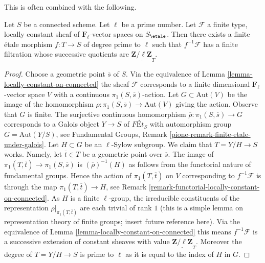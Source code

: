 \medskip\noindent
This is often combined with the following.

\begin{lemma}
\label{lemma-pullback-filtered}
Let $S$ be a connected scheme. Let $\ell$ be a prime number. Let
$\mathcal{F}$ a finite type, locally constant sheaf of
$\mathbf{F}_\ell$-vector spaces on $S_\etale$.
Then there exists a finite \'etale morphism
$f : T \to S$ of degree prime to $\ell$ such that $f^{-1}\mathcal{F}$
has a finite filtration whose successive quotients are
$\underline{\mathbf{Z}/\ell\mathbf{Z}}_T$.
\end{lemma}

\begin{proof}
Choose a geometric point $\overline{s}$ of $S$.
Via the equivalence of Lemma \ref{lemma-locally-constant-on-connected}
the sheaf $\mathcal{F}$ corresponds to a finite dimensional
$\mathbf{F}_\ell$-vector space $V$ with a continuous
$\pi_1(S, \overline{s})$-action.
Let $G \subset \text{Aut}(V)$ be the image of the homomorphism
$\rho : \pi_1(S, \overline{s}) \to \text{Aut}(V)$ giving the action.
Observe that $G$ is finite.
The surjective continuous homomorphism
$\overline{\rho} : \pi_1(S, \overline{s}) \to G$
corresponds to a Galois object $Y \to S$ of
$\textit{F\'Et}_S$ with automorphism group $G = \text{Aut}(Y/S)$, see
Fundamental Groups, Remark \ref{pione-remark-finite-etale-under-galois}.
Let $H \subset G$ be an $\ell$-Sylow subgroup.
We claim that $T = Y/H \to S$ works. Namely, let $\overline{t} \in T$
be a geometric point over $\overline{s}$. The image of
$\pi_1(T, \overline{t}) \to \pi_1(S, \overline{s})$
is $(\overline{\rho})^{-1}(H)$ as follows from the functorial
nature of fundamental groups. Hence the action of $\pi_1(T, \overline{t})$
on $V$ corresponding to $f^{-1}\mathcal{F}$ is through
the map $\pi_1(T, \overline{t}) \to H$, see
Remark \ref{remark-functorial-locally-constant-on-connected}. As
$H$ is a finite $\ell$-group, the irreducible constituents of the
representation $\rho|_{\pi_1(T, \overline{t})}$
are each trivial of rank $1$ (this is a simple lemma on
representation theory of finite groups; insert future reference here).
Via the equivalence of
Lemma \ref{lemma-locally-constant-on-connected}
this means $f^{-1}\mathcal{F}$ is a successive extension of
constant sheaves with value $\underline{\mathbf{Z}/\ell\mathbf{Z}}_T$.
Moreover the degree of $T = Y/H \to S$ is prime to $\ell$
as it is equal to the index of $H$ in $G$.
\end{proof}






